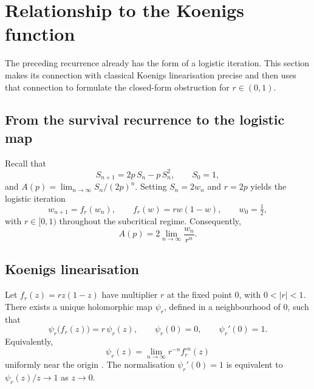 \section{Relationship to the Koenigs function}\label{a:sec:koenigs}
\label{a:sec:koenigs-link}

The preceding recurrence already has the form of a logistic iteration.  This
section makes its connection with classical Koenigs linearisation precise and then
uses that connection to formulate the closed-form obstruction for $r\in(0,1)$.

\subsection{From the survival recurrence to the logistic map}

Recall that
\[
S_{n+1}=2p\,S_n-p\,S_n^2,\qquad S_0=1,
\]
and $A(p)=\lim_{n\to\infty}S_n/(2p)^n$. Setting $S_n=2w_n$ and $r=2p$ yields the logistic iteration
\begin{equation}
\label{a:eq:logistic-koenigs}
w_{n+1}=f_r(w_n),\qquad f_r(w)=r w(1-w),\qquad w_0=\tfrac12,
\end{equation}
with $r\in[0,1)$ throughout the subcritical regime.  Consequently,
\begin{equation}
\label{a:eq:A-from-w}
A(p)=2\lim_{n\to\infty}\frac{w_n}{r^n}.
\end{equation}

\subsection{Koenigs linearisation}

\begin{definition}
\label{a:def:koenigs}
Let $f_r(z)=r z(1-z)$ have multiplier $r$ at the fixed point $0$, with
$0<|r|<1$.  There exists a unique holomorphic map $\psi_r$, defined in a
neighbourhood of $0$, such that
\begin{equation}
\label{a:eq:schroder}
\psi_r\bigl(f_r(z)\bigr)=r\,\psi_r(z),\qquad \psi_r(0)=0,\qquad \psi_r'(0)=1.
\end{equation}
Equivalently,
\begin{equation}
\label{a:eq:koenigs-limit}
\psi_r(z)=\lim_{n\to\infty} r^{-n} f_r^{\circ n}(z)
\end{equation}
uniformly near the origin \cite{Koenigs1884}.  The normalisation
$\psi_r'(0)=1$ is equivalent to $\psi_r(z)/z\to1$ as $z\to0$.
\end{definition}

